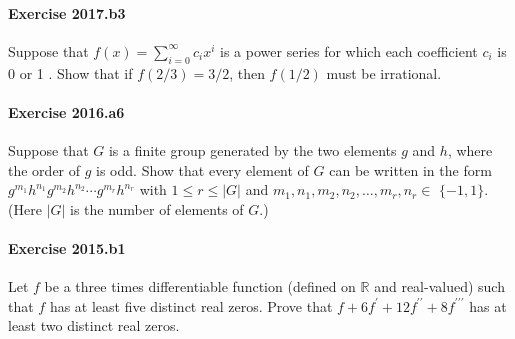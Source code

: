 \documentclass{article}
\begin{document}
\paragraph{Exercise 2017.b3} Suppose that $f(x)=\sum_{i=0}^{\infty} c_{i} x^{i}$ is a power series for which each coefficient $c_{i}$ is 0 or 1 . Show that if $f(2 / 3)=3 / 2$, then $f(1 / 2)$ must be irrational.

\paragraph{Exercise 2016.a6} Suppose that $G$ is a finite group generated by the two elements $g$ and $h$, where the order of $g$ is odd. Show that every element of $G$ can be written in the form $g^{m_1} h^{n_1} g^{m_2} h^{n_2} \cdots g^{m_r} h^{n_r}$
with $1 \leq r \leq|G|$ and $m_1, n_1, m_2, n_2, \ldots, m_r, n_r \in$ $\{-1,1\} .$ (Here $|G|$ is the number of elements of $G$.)

\paragraph{Exercise 2015.b1} Let $f$ be a three times differentiable function (defined on $\mathbb{R}$ and real-valued) such that $f$ has at least five distinct real zeros. Prove that $f+6 f^{\prime}+12 f^{\prime \prime}+8 f^{\prime \prime \prime}$ has at least two distinct real zeros.
\end{document}
